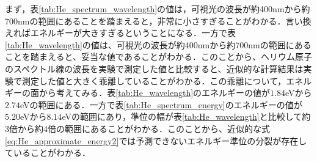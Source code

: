 \documentclass[a4paper,dvipdfmx,10.5pt]{jarticle}
\begin{document}
 まず，表\ref{tab:He_spectrum_wavelength}の値は，可視光の波長が約400nmから約700nmの範囲にあることを踏まえると，非常に小さすぎることがわかる．言い換えればエネルギーが大きすぎるということになる．一方で表\ref{tab:He_wavelength}の値は、可視光の波長が約400nmから約700nmの範囲にあることを踏まえると、妥当な値であることがわかる．このことから、ヘリウム原子のスペクトル線の波長を実験で測定した値と比較すると、近似的な計算結果は実験で測定した値と大きく乖離していることがわかる．この乖離について，エネルギーの面から考えてみる．表\ref{tab:He_wavelength}のエネルギーの値が$1.84$eVから$2.74$eVの範囲にある．一方で表\ref{tab:He_spectrum_energy}のエネルギーの値が$5.20$eVから$8.14$eVの範囲にあり，準位の幅が表\ref{tab:He_wavelength}と比較して約3倍から約4倍の範囲にあることがわかる．このことから、近似的な式\eqref{eq:He_approximate_energy2}では予測できないエネルギー準位の分裂が存在していることがわかる．
 
\end{document}

